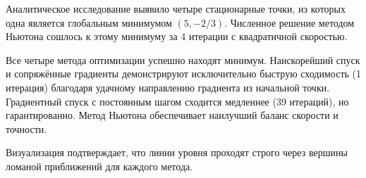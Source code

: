 Аналитическое исследование выявило четыре стационарные точки, из которых одна является глобальным минимумом $(5, -2/3)$. Численное решение методом Ньютона сошлось к этому минимуму за 4 итерации с квадратичной скоростью.

Все четыре метода оптимизации успешно находят минимум. Наискорейший спуск и сопряжённые градиенты демонстрируют исключительно быструю сходимость (1 итерация) благодаря удачному направлению градиента из начальной точки. Градиентный спуск с постоянным шагом сходится медленнее (39 итераций), но гарантированно. Метод Ньютона обеспечивает наилучший баланс скорости и точности.

Визуализация подтверждает, что линии уровня проходят строго через вершины ломаной приближений для каждого метода.
